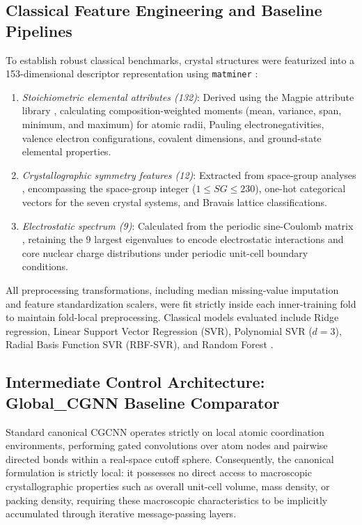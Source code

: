 \documentclass[final,3p,times]{elsarticle}
\begin{document}
\subsection{Classical Feature Engineering and Baseline Pipelines}
To establish robust classical benchmarks, crystal structures were featurized into a 153-dimensional descriptor representation using \texttt{matminer} \cite{ward2018matminer}:
\begin{enumerate}
    \item \textit{Stoichiometric elemental attributes (132)}: Derived using the Magpie attribute library \cite{ward2016general}, calculating composition-weighted moments (mean, variance, span, minimum, and maximum) for atomic radii, Pauling electronegativities, valence electron configurations, covalent dimensions, and ground-state elemental properties.
    \item \textit{Crystallographic symmetry features (12)}: Extracted from space-group analyses \cite{ong2013python}, encompassing the space-group integer ($1 \le SG \le 230$), one-hot categorical vectors for the seven crystal systems, and Bravais lattice classifications.
    \item \textit{Electrostatic spectrum (9)}: Calculated from the periodic sine-Coulomb matrix \cite{ong2013python}, retaining the 9 largest eigenvalues to encode electrostatic interactions and core nuclear charge distributions under periodic unit-cell boundary conditions.
\end{enumerate}
All preprocessing transformations, including median missing-value imputation and feature standardization scalers, were fit strictly inside each inner-training fold to maintain fold-local preprocessing. Classical models evaluated include Ridge regression, Linear Support Vector Regression (SVR), Polynomial SVR ($d=3$), Radial Basis Function SVR (RBF-SVR), and Random Forest \cite{pedregosa2011scikit}.

\subsection{Intermediate Control Architecture: Global\_CGNN Baseline Comparator}
Standard canonical CGCNN \cite{xie2018crystal} operates strictly on local atomic coordination environments, performing gated convolutions over atom nodes and pairwise directed bonds within a real-space cutoff sphere. Consequently, the canonical formulation is strictly local: it possesses no direct access to macroscopic crystallographic properties such as overall unit-cell volume, mass density, or packing density, requiring these macroscopic characteristics to be implicitly accumulated through iterative message-passing layers.
\end{document}
